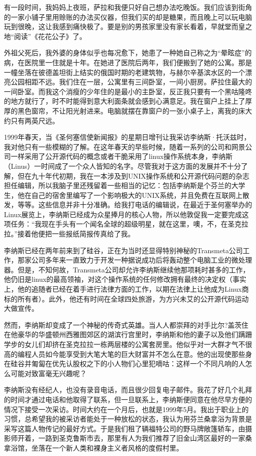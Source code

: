 有一段时间，我妈妈上夜班，萨拉和我便只好自己想办法吃晚饭。我们应该到街角的一家小铺子里用赊账的办法买仪器，但我们买的却是糖果，而且晚上可以玩电脑玩到很晚，这让我感到痛快极了。要是别的男孩家里没有家长看着，早就堂而皇之地“阅读”《花花公子》了。

外祖父死后，我外婆的身体似乎也每况愈下，她患了一种她自己称之为“晕眩症”的病，在医院里一住就是十年。在她进了医院后两年，我们便搬到了她的公寓。那是一幢坐落在彼德盖坦街上结实的俄国时期的老建筑物，与赫尔辛基滨水区的一个漂亮公园相距不远。我们住在一层，公寓里有三间卧室，一间小厨房。萨拉住最大的一间卧室。而我这个消瘦的少年住的是最小的主卧室，反正我只要有一个黑咕隆咚的地方就行了，时不时能得到意大利面条就会感到心满意足。我在窗户上挂上了厚厚的黑色窗帘，不让阳光射进来。电脑就摆在靠窗户的一张小桌子上，离我的床大约只有两英尺远。

 
1999年春天，当《圣何塞信使新闻报》的星期日增刊让我采访李纳斯·托沃兹时，我对他只有一些模糊的了解。在这年春天的早些时候，随着一系列的公司和网景公司一样采用了公开源代码的概念或者干脆采用了linux操作系统本身，李纳斯（Linus）一时间成了一个众人皆知的名字。尽管我对于这方面的发展并不十分了解，但在九十年代初期，我在一本涉及到UNIX操作系统和公开源代码问题的杂志担任编辑，所以我脑子里还残留着一些相当的记忆：包括李纳斯是个芬兰的大学生，他在自己的宿舍里编写了一个影响极大的UNIX系统，并且免费在互联网上散发，等等。这些信息并非十分准确。给我打电话的编辑说，在最近于圣何塞举办的Linux展览上，李纳斯已经成为众星捧月的核心人物，所以他敦促我一定要完成这项任务：“我现在手头有一个闻名全球的超级明星，就在这里，噢，不，在圣克拉拉。”接着他便把一些报纸简报传真给了我。

李纳斯已经在两年前来到了硅谷，正在为当时还显得特别神秘的Transmeta公司工作，那家公司多年来一直致力于开发一种据说成功后将轰动整个电脑工业的微处理器。但是，不知何故，Transmeta公司却允许李纳斯继续他那项耗时甚多的工作，他仍旧是linux的最高领袖，对这个操作系统的任何修改拥有最终的决定权（事实上，他的追随者已经在着手进行法律方面的工作，以期在法律上让他成为Linux商标的所有者）。此外，他还有时间在全球四处旅游，为方兴未艾的公开源代码运动大做宣传。

然而，李纳斯却变成了一个神秘的传奇式英雄。当人人都崇拜的对手比尔?盖茨住在他豪华的华盛顿州西雅图郊区的湖滨行宫里时，李纳斯和他的妻子以及他们蹒跚学步的女儿们却挤在圣克拉拉一栋两层楼的公寓套房里。他似乎对一大群才气不很高的编程人员如今能享受到大笔大笔的巨大财富并不怎么在意。他的出现使那些身在硅谷并匍匐在优先认股权之下的小人物们心里犯嘀咕：这样一个不同凡响的人怎么可能对致富毫无兴趣呢？

李纳斯没有经纪人，也没有录音电话，而且很少回复电子邮件。我花了好几个礼拜的时间才通过电话和他取得了联系，但一旦联系上，李纳斯便同意在他尽早方便的情况下接受一次采访。时间大约在一个月后，也就是1999年5月。我出于职业上的习惯，总希望我的被采访者能处于一种放松的状态，我认为用芬兰桑拿浴为背景是采写这篇人物传记的最好方式。于是我们租了辆福特公司的野马牌敞篷轿车，由摄影师开着，一路到圣克鲁斯市去，那里有人为我们推荐了旧金山湾区最好的一家桑拿浴馆，坐落在一个新人类和裸身主义者风格的度假村里。

